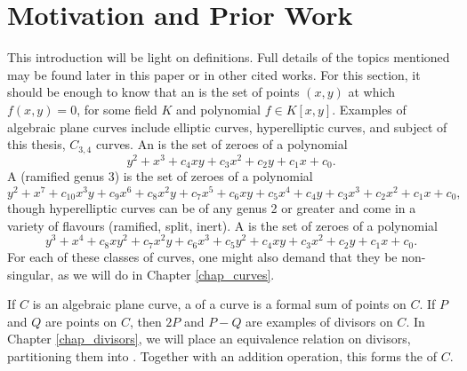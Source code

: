 

\section{Motivation and Prior Work}

This introduction will be light on definitions.
Full details of the topics mentioned may be found later in this paper or in other cited works.
For this section, it should be enough to know that an  is the set of points $(x,y)$
at which $f(x, y) = 0$, for some field $K$ and polynomial $f \in K[x,y]$.
Examples of algebraic plane curves include elliptic curves, hyperelliptic curves,
and subject of this thesis, $C_{3,4}$ curves.
An  is the set of zeroes of a polynomial
\begin{equation}
  \label{eq_elliptic}
  y^2 + x^3 + c_4xy + c_3x^2 + c_2y + c_1x + c_0.
\end{equation}
A (ramified genus 3)  is the set of zeroes of a polynomial
\begin{equation}
  \label{eq_genus_3_hyperelliptic}
  y^2 + x^7 + c_{10}x^3y + c_9x^6 + c_8x^2y + c_7x^5 + c_6xy + c_5x^4 + c_4y + c_3x^3 + c_2x^2 + c_1x + c_0,
\end{equation}
though hyperelliptic curves can be of any genus 2 or greater and come in a variety of flavours (ramified, split, inert).
A  is the set of zeroes of a polynomial
\begin{equation}
  \label{eq_c34_intro}
  y^3 + x^4 + c_8xy^2 + c_7x^2y + c_6x^3 + c_5y^2 + c_4xy + c_3x^2 + c_2y + c_1x + c_0.
\end{equation}
For each of these classes of curves, one might also demand that they be non-singular,
as we will do in Chapter \ref{chap_curves}.

If $C$ is an algebraic plane curve, a  of a curve is a formal sum of points on $C$.
If $P$ and $Q$ are points on $C$, then $2P$ and $P - Q$ are examples of divisors on $C$.
In Chapter \ref{chap_divisors}, we will place an equivalence relation on divisors,
partitioning them into .
Together with an addition operation, this forms the  of $C$.




